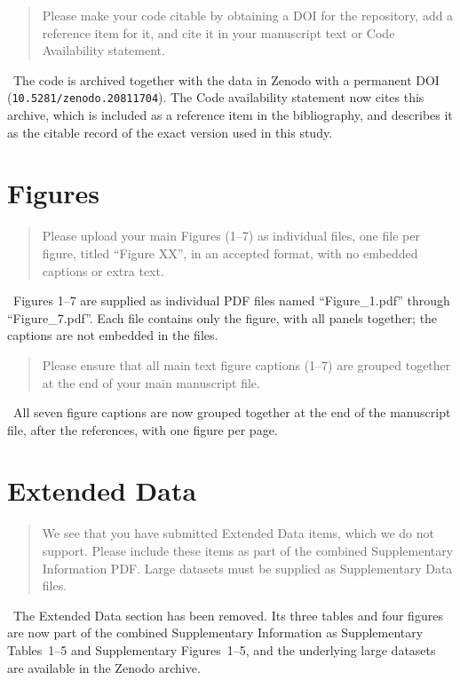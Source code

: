 \documentclass[11pt]{article}
\newcommand{\reply}{\vspace{0.25em}{\color{ForestGreen}\textbf{Reply:}}\ }
\newenvironment{editorcomment}
{\vspace{0.5em}\begin{quote}\color{NavyBlue}}
{\end{quote}}
\begin{document}
\begin{editorcomment}
Please make your code citable by obtaining a DOI for the repository, add a
reference item for it, and cite it in your manuscript text or Code Availability
statement.
\end{editorcomment}

\reply The code is archived together with the data in Zenodo with a permanent
DOI (\texttt{10.5281/zenodo.20811704}). The Code availability statement now
cites this archive, which is included as a reference item in the bibliography,
and describes it as the citable record of the exact version used in this study.

\section*{Figures}

\begin{editorcomment}
Please upload your main Figures (1--7) as individual files, one file per figure,
titled ``Figure XX'', in an accepted format, with no embedded captions or extra
text.
\end{editorcomment}

\reply Figures 1--7 are supplied as individual PDF files named ``Figure\_1.pdf''
through ``Figure\_7.pdf''. Each file contains only the figure, with all panels
together; the captions are not embedded in the files.

\begin{editorcomment}
Please ensure that all main text figure captions (1--7) are grouped together at
the end of your main manuscript file.
\end{editorcomment}

\reply All seven figure captions are now grouped together at the end of the
manuscript file, after the references, with one figure per page.

\section*{Extended Data}

\begin{editorcomment}
We see that you have submitted Extended Data items, which we do not support.
Please include these items as part of the combined Supplementary Information
PDF. Large datasets must be supplied as Supplementary Data files.
\end{editorcomment}

\reply The Extended Data section has been removed. Its three tables and four
figures are now part of the combined Supplementary Information as Supplementary
Tables~1--5 and Supplementary Figures~1--5, and the underlying large datasets are
available in the Zenodo archive.
\end{document}
